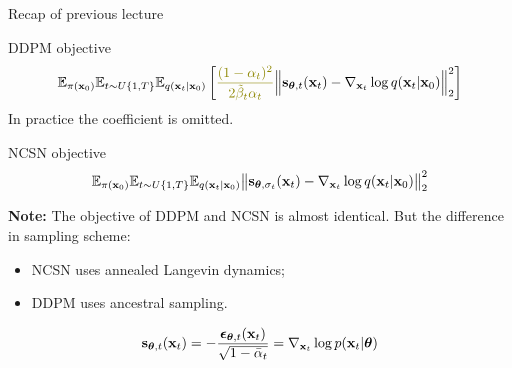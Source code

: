 \begin{frame}{Recap of previous lecture}
	\begin{block}{DDPM objective}
		\vspace{-0.5cm}
		\[
			\bbE_{\pi(\bx_0)} \bbE_{t \sim U\{1, T\}}\bbE_{q(\bx_t | \bx_0)} \left[ {\color{olive}\frac{(1 - \alpha_t)^2}{2\tilde{\beta}_t \alpha_t}} \Bigl\|  \bs_{\btheta, t} (\bx_t) - \nabla_{\bx_t} \log q(\bx_t | \bx_0) \Bigr\|_2^2  \right]
		\]
		In practice {\color{olive}the coefficient} is omitted.
	\end{block}
	\begin{block}{NCSN objective}
		\vspace{-0.3cm}
		\[
			\mathbb{E}_{\pi(\mathbf{x}_0)} \mathbb{E}_{t \sim U\{1, T\}} \mathbb{E}_{q(\mathbf{x}_t | \mathbf{x}_0)}\bigl\| \mathbf{s}_{\boldsymbol{\theta}, \sigma_t}(\mathbf{x}_t) - \nabla_{\mathbf{x}_t} \log q(\mathbf{x}_t | \mathbf{x}_0) \bigr\|^2_2 
		\]
		\vspace{-0.3cm}
	\end{block}
	\textbf{Note:} The objective of DDPM and NCSN is almost identical. But the difference in sampling scheme:
	\begin{itemize}
		\item NCSN uses annealed Langevin dynamics;
		\item DDPM uses ancestral sampling.
	\end{itemize}
	\[
		\mathbf{s}_{\boldsymbol{\theta}, t}(\mathbf{x}_t) = - \frac{\boldsymbol{\epsilon}_{\boldsymbol{\theta}, t}(\mathbf{x}_t)}{\sqrt{1 - \bar{\alpha}_t}} = \nabla_{\mathbf{x}_t} \log p(\mathbf{x}_t | \boldsymbol{\theta})
	\]
	\end{frame}
